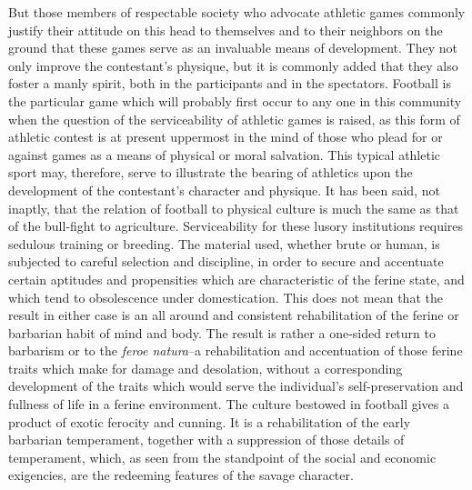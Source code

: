 \documentclass[12pt]{report}
\begin{document}
But those members of respectable society who advocate athletic games
commonly justify their attitude on this head to themselves and to their
neighbors on the ground that these games serve as an invaluable means of
development. They not only improve the contestant's physique, but it
is commonly added that they also foster a manly spirit, both in the
participants and in the spectators. Football is the particular game
which will probably first occur to any one in this community when the
question of the serviceability of athletic games is raised, as this form
of athletic contest is at present uppermost in the mind of those who
plead for or against games as a means of physical or moral salvation.
This typical athletic sport may, therefore, serve to illustrate the
bearing of athletics upon the development of the contestant's character
and physique. It has been said, not inaptly, that the relation of
football to physical culture is much the same as that of the bull-fight
to agriculture. Serviceability for these lusory institutions requires
sedulous training or breeding. The material used, whether brute or
human, is subjected to careful selection and discipline, in order to
secure and accentuate certain aptitudes and propensities which are
characteristic of the ferine state, and which tend to obsolescence under
domestication. This does not mean that the result in either case is
an all around and consistent rehabilitation of the ferine or barbarian
habit of mind and body. The result is rather a one-sided return to
barbarism or to the \emph{feroe natura}--a rehabilitation and accentuation
of those ferine traits which make for damage and desolation, without
a corresponding development of the traits which would serve the
individual's self-preservation and fullness of life in a ferine
environment. The culture bestowed in football gives a product of exotic
ferocity and cunning. It is a rehabilitation of the early barbarian
temperament, together with a suppression of those details of
temperament, which, as seen from the standpoint of the social and
economic exigencies, are the redeeming features of the savage character.
\end{document}

